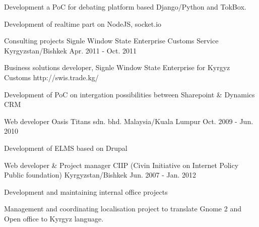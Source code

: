\begin{cventries}
{\begin{cvitems}
        \item {Development a PoC for debating platform based Django/Python and TokBox.}
        \item {Development of realtime part on NodeJS, socket.io}
      \end{cvitems}
    }
    \cventry
      {Consulting projects}
      {Signle Window State Enterprise Customs Service}
      {Kyrgyzstan/Bishkek}
      {Apr. 2011 - Oct. 2011}
      {
        \begin{cvitems}
          \item {Business solutions developer, Signle Window State Enterprise for Kyrgyz Customs http://swis.trade.kg/}
          \item {Development of PoC on intergation possibilities between Sharepoint \& Dynamics CRM}
        \end{cvitems}
      }
    \cventry
      {Web developer}
      {Oasis Titans sdn. bhd.}
      {Malaysia/Kuala Lumpur}
      {Oct. 2009 - Jun. 2010}
      {
        \begin{cvitems}
          \item {Development of ELMS based on Drupal}
        \end{cvitems}
      }
    \cventry
      {Web developer \& Project manager}
      {CIIP (Civin Initiative on Internet Policy Public foundation)}
      {Kyrgyzstan/Bishkek}
      {Jun. 2007 - Jan. 2012}
      {
        \begin{cvitems}
          \item {Development and maintaining internal office projects}
          \item {Management and coordinating localisation project to translate Gnome 2 and Open office to Kyrgyz language.}
        \end{cvitems}
      }
\end{cventries}
